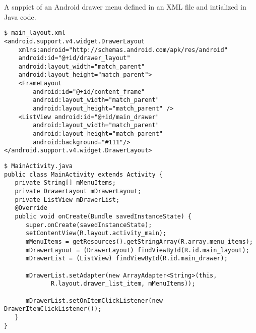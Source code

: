 \begin{listing}[!htb]
	\caption{A snppiet of an Android drawer menu defined in an XML file and intialized in Java code.}
	\begin{verbatim}
$ main_layout.xml
<android.support.v4.widget.DrawerLayout
    xmlns:android="http://schemas.android.com/apk/res/android"
    android:id="@+id/drawer_layout"
    android:layout_width="match_parent"
    android:layout_height="match_parent">
    <FrameLayout
        android:id="@+id/content_frame"
        android:layout_width="match_parent"
        android:layout_height="match_parent" />
    <ListView android:id="@+id/main_drawer"
        android:layout_width="match_parent"
        android:layout_height="match_parent"
        android:background="#111"/>
</android.support.v4.widget.DrawerLayout>
\end{verbatim}
\begin{verbatim}
$ MainActivity.java
public class MainActivity extends Activity {
   private String[] mMenuItems;
   private DrawerLayout mDrawerLayout;
   private ListView mDrawerList;
   @Override
   public void onCreate(Bundle savedInstanceState) {
      super.onCreate(savedInstanceState);
      setContentView(R.layout.activity_main);
      mMenuItems = getResources().getStringArray(R.array.menu_items);    
      mDrawerLayout = (DrawerLayout) findViewById(R.id.main_layout);
      mDrawerList = (ListView) findViewById(R.id.main_drawer);
				
      mDrawerList.setAdapter(new ArrayAdapter<String>(this,
             R.layout.drawer_list_item, mMenuItems));
				
      mDrawerList.setOnItemClickListener(new DrawerItemClickListener());
   }
}
\end{verbatim}
	\label{lst:ui_example}
\end{listing}
